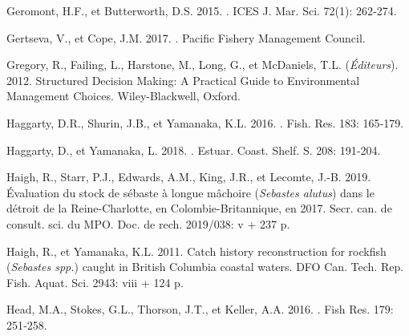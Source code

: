 \documentclass[french,11pt]{book}
\begin{document}
\begin{CSLReferences}{1}{0}
%
Geromont, H.F., et Butterworth, D.S. 2015. . ICES J. Mar. Sci. 72(1): 262‑274.

%
Gertseva, V., et Cope, J.M. 2017. . Pacific Fishery Management Council.

%
Gregory, R., Failing, L., Harstone, M., Long, G., et McDaniels, T.L. (\emph{Éditeurs}). 2012. Structured Decision Making: A Practical Guide to Environmental Management Choices. {Wiley-Blackwell}, Oxford.

%
Haggarty, D.R., Shurin, J.B., et Yamanaka, K.L. 2016. . Fish. Res. 183: 165‑179.

%
Haggarty, D., et Yamanaka, L. 2018. . Estuar. Coast. Shelf. S. 208: 191‑204.

%
Haigh, R., Starr, P.J., Edwards, A.M., King, J.R., et Lecomte, J.-B. 2019. Évaluation du stock de sébaste à longue mâchoire ({\emph{Sebastes alutus}}) dans le détroit de la {Reine-Charlotte}, en {Colombie-Britannique}, en 2017. Secr. can. de consult. sci. du MPO. Doc. de rech. 2019/038: v + 237 p.

%
Haigh, R., et Yamanaka, K.L. 2011. Catch history reconstruction for rockfish ({\emph{Sebastes spp.}}) caught in {British Columbia} coastal waters. DFO Can. Tech. Rep. Fish. Aquat. Sci. 2943: viii + 124 p.

%
Head, M.A., Stokes, G.L., Thorson, J.T., et Keller, A.A. 2016. . Fish Res. 179: 251‑258.


\end{CSLReferences}
\end{document}
